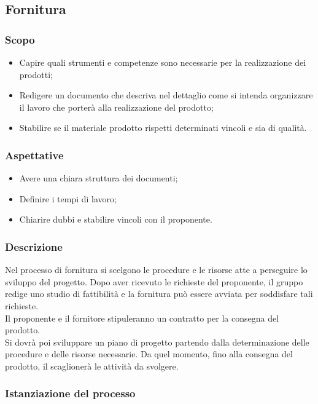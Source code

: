 \subsection{Fornitura}
\subsubsection{Scopo}
\begin{itemize}
\item Capire quali strumenti e competenze sono necessarie per la realizzazione dei prodotti;

\item Redigere un documento che descriva nel dettaglio come si intenda organizzare il lavoro che porterà alla realizzazione del prodotto;

\item Stabilire se il materiale prodotto rispetti determinati vincoli e sia di qualità.

\end{itemize}

\subsubsection{Aspettative}
\begin{itemize}
	\item Avere una chiara struttura dei documenti;
	\item Definire i tempi di lavoro;
	\item Chiarire dubbi e stabilire vincoli con il proponente.
\end{itemize}

\subsubsection{Descrizione}
Nel processo di fornitura si scelgono le procedure e le risorse atte a perseguire lo sviluppo del progetto. Dopo aver ricevuto le richieste del proponente, il gruppo redige uno studio di fattibilità e la fornitura può essere avviata per soddisfare tali richieste.\\
Il proponente e il fornitore stipuleranno un contratto per la consegna del prodotto.\\
Si dovrà poi sviluppare un piano di progetto partendo dalla determinazione delle procedure e delle risorse necessarie.
Da quel momento, fino alla consegna del prodotto, il \PdP{} scaglionerà le attività da svolgere.
\subsubsection{Istanziazione del processo}
